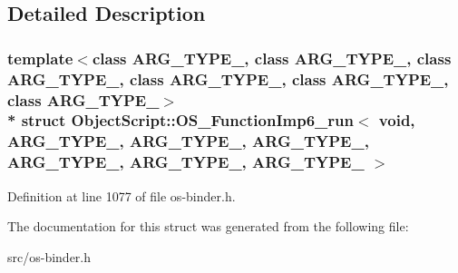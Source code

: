 \subsection{Detailed Description}
\subsubsection*{template$<$class A\+R\+G\+\_\+\+T\+Y\+P\+E\+\_, class A\+R\+G\+\_\+\+T\+Y\+P\+E\+\_, class A\+R\+G\+\_\+\+T\+Y\+P\+E\+\_, class A\+R\+G\+\_\+\+T\+Y\+P\+E\+\_, class A\+R\+G\+\_\+\+T\+Y\+P\+E\+\_, class A\+R\+G\+\_\+\+T\+Y\+P\+E\+\_$>$\\*
struct Object\+Script\+::\+O\+S\+\_\+\+Function\+Imp6\+\_\+run$<$ void,   A\+R\+G\+\_\+\+T\+Y\+P\+E\+\_, A\+R\+G\+\_\+\+T\+Y\+P\+E\+\_, A\+R\+G\+\_\+\+T\+Y\+P\+E\+\_, A\+R\+G\+\_\+\+T\+Y\+P\+E\+\_, A\+R\+G\+\_\+\+T\+Y\+P\+E\+\_, A\+R\+G\+\_\+\+T\+Y\+P\+E\+\_ $>$}



Definition at line 1077 of file os-\/binder.\+h.



The documentation for this struct was generated from the following file\+:\begin{DoxyCompactItemize}
\item 
src/os-\/binder.\+h\end{DoxyCompactItemize}
